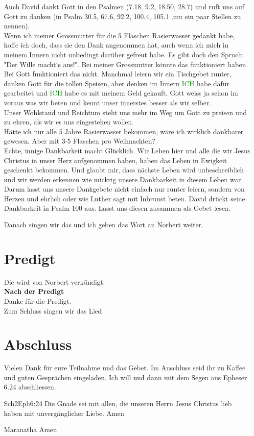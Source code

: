\documentclass{../inc/mybib}
\begin{document}
\begin{spacing}{1.5}
Auch David dankt Gott in den Psalmen (7.18, 9.2, 18.50, 28.7) und ruft uns auf Gott zu danken (in Psalm 30.5, 67.6, 92.2, 100.4, 105.1 ,um ein paar Stellen zu nennen).\\
Wenn ich meiner Grossmutter für die 5 Flaschen Rasierwasser gedankt habe, hoffe ich doch, dass sie den Dank angenommen hat, auch wenn ich mich in meinem Innern nicht unbedingt darüber gefreut habe. Es gibt doch den Spruch: "Der Wille macht`s aus!". Bei meiner Grossmutter könnte das funktioniert haben. Bei Gott funktioniert das nicht. Manchmal leiern wir ein Tischgebet runter, danken Gott für die tollen Speisen, aber denken im Innern \textcolor{green}{ICH} habe dafür gearbeitet und \textcolor{green}{ICH} habe es mit meinem Geld gekauft. Gott weiss ja schon im voraus was wir beten und kennt unser innerstes besser als wir selber.\\ Unser Wohlstand und Reichtum steht uns mehr im Weg um Gott zu preisen und zu ehren, als wir es uns eingestehen wollen.\\ Hätte ich nur alle 5 Jahre Rasierwasser bekommen, wäre ich wirklich dankbarer gewesen. Aber mit 3-5  Flaschen pro Weihnachten?\\ Echte, innige Dankbarkeit macht Glücklich. Wir Leben hier und alle die wir Jesus Christus in unser Herz aufgenommen haben, haben das Leben in Ewigkeit geschenkt bekommen. Und glaubt mir, dass nächste Leben wird unbeschreiblich und wir werden erkennen wie mickrig unsere Dankbarkeit in diesem Leben war. Darum lasst uns unsere Dankgebete nicht einfach nur runter leiern, sondern von Herzen und ehrlich oder wie Luther sagt mit Inbrunst beten. David drückt seine Dankbarkeit in Psalm 100 aus. Lasst uns diesen zusammen als Gebet lesen.

Danach singen wir das  und ich geben das Wort an Norbert weiter.

\end{spacing}

\section{Predigt}
Die wird von Norbert verkündigt.\\

\textbf{Nach der Predigt}\\

Danke für die Predigt.\\

Zum Schluss singen wir das Lied 

\section{Abschluss}
Vielen Dank für eure Teilnahme und das Gebet. Im Anschluss seid ihr zu Kaffee und guten Gesprächen eingeladen.
Ich will \beten{} und dann mit dem Segen aus Epheser 6.24 abschliessen.
\begin{bibeltext}{Sch2}{Eph}{6:24}
Die Gnade sei mit allen, die unseren Herrn Jesus Christus lieb haben mit unvergänglicher Liebe. Amen
\end{bibeltext}
Maranatha Amen
\end{document}
